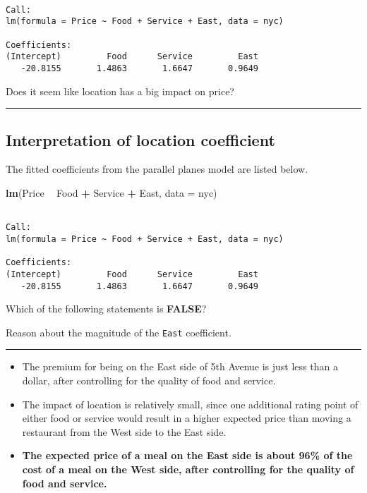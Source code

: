 \documentclass[]{book}
\newenvironment{Shaded}{\begin{snugshade}}{\end{snugshade}}
\newcommand{\KeywordTok}[1]{\textcolor[rgb]{0.13,0.29,0.53}{\textbf{#1}}}
\newcommand{\DataTypeTok}[1]{\textcolor[rgb]{0.13,0.29,0.53}{#1}}
\newcommand{\StringTok}[1]{\textcolor[rgb]{0.31,0.60,0.02}{#1}}
\newcommand{\OperatorTok}[1]{\textcolor[rgb]{0.81,0.36,0.00}{\textbf{#1}}}
\newcommand{\NormalTok}[1]{#1}
\begin{document}
\begin{verbatim}

Call:
lm(formula = Price ~ Food + Service + East, data = nyc)

Coefficients:
(Intercept)         Food      Service         East  
   -20.8155       1.4863       1.6647       0.9649  
\end{verbatim}

Does it seem like location has a big impact on price?

\begin{center}\rule{0.5\linewidth}{\linethickness}\end{center}

\subsection*{Interpretation of location
coefficient}\label{interpretation-of-location-coefficient}

The fitted coefficients from the parallel planes model are listed below.

\begin{Shaded}
\begin{Highlighting}[]
\KeywordTok{lm}\NormalTok{(Price }\OperatorTok{~}\StringTok{ }\NormalTok{Food }\OperatorTok{+}\StringTok{ }\NormalTok{Service }\OperatorTok{+}\StringTok{ }\NormalTok{East, }\DataTypeTok{data =}\NormalTok{ nyc)}
\end{Highlighting}
\end{Shaded}

\begin{verbatim}

Call:
lm(formula = Price ~ Food + Service + East, data = nyc)

Coefficients:
(Intercept)         Food      Service         East  
   -20.8155       1.4863       1.6647       0.9649  
\end{verbatim}

Which of the following statements is \textbf{FALSE}?

Reason about the magnitude of the \texttt{East} coefficient.

\begin{center}\rule{0.5\linewidth}{\linethickness}\end{center}

\begin{itemize}
\item
  The premium for being on the East side of 5th Avenue is just less than
  a dollar, after controlling for the quality of food and service.
\item
  The impact of location is relatively small, since one additional
  rating point of either food or service would result in a higher
  expected price than moving a restaurant from the West side to the East
  side.
\item
  \textbf{The expected price of a meal on the East side is about 96\% of
  the cost of a meal on the West side, after controlling for the quality
  of food and service.}
\end{itemize}
\end{document}
